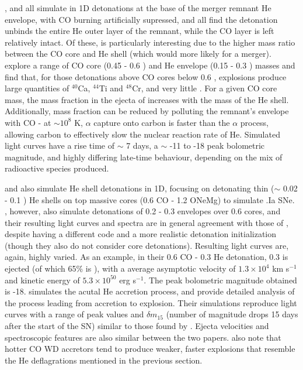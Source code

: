 \cite{woosk10}, \cite{shen+10} and \cite{wald+10} all simulate in 1D detonations at the base of the merger remnant He envelope, with CO burning artificially supressed, and all find the detonation unbinds the entire He outer layer of the remnant, while the CO layer is left relatively intact.  Of these, \citeauthor{wald+10} is particularly interesting due to the higher mass ratio between the CO core and He shell (which would more likely for a merger).  \citeauthor{wald+10} explore a range of CO core (0.45 - 0.6 {\Msun}) and He envelope (0.15 - 0.3 {\Msun}) masses and find that, for those detonations above CO cores below 0.6 {\Msun}, explosions produce large quantities of $^{40}$Ca, $^{44}$Ti and $^{48}$Cr, and very little {\Ni}.  For a given CO core mass, the mass fraction in the ejecta of {\Ni} increases with the mass of the He shell.  Additionally, {\Ni} mass fraction can be reduced by polluting the remnant's envelope with CO - at $\sim 10^8$ K, $\alpha$ capture onto carbon is faster than the $\alpha$ process, allowing carbon to effectively slow the nuclear reaction rate of He.  Simulated light curves have a rise time of $\sim$ 7 days, a $\sim$ -11 to -18 peak bolometric magnitude, and highly differing late-time behaviour, depending on the mix of radioactive species produced.

\cite{shen+10} and \cite{woosk10} also simulate He shell detonations in 1D, focusing on detonating thin ($\sim$ 0.02 - 0.1 {\Msun}) He shells on top massive cores (0.6 {\Msun} CO - 1.2 {\Msun} ONeMg) to simulate .Ia SNe.  \citeauthor{shen+10}, however, also simulate detonations of 0.2 - 0.3 {\Msun} envelopes over 0.6 {\Msun} cores, and their resulting light curves and spectra are in general agreement with those of \citeauthor{wald+10}, despite having a different code and a more realistic detonation initialization (though they also do not consider core detonations).  Resulting light curves are, again, highly varied.  As an example, in their 0.6 {\Msun} CO - 0.3 {\Msun} He detonation, 0.3 {\Msun} is ejected (of which 65\% is {\Ni}), with a average asymptotic velocity of $1.3 \times 10^{4}$ km s$^{-1}$ and kinetic energy of $5.3 \times 10^{50}$ erg s$^{-1}$.  The peak bolometric magnitude obtained is -18.  \citeauthor{woosk10} simulates the acutal He accretion process, and provide detailed analysis of the process leading from accretion to explosion.  Their simulations reproduce light curves with a range of peak values and ${\delta}m_{15}$ (number of magnitude drops 15 days after the start of the SN) similar to those found by \citeauthor{shen+10}.  Ejecta velocities and spectroscopic features are also similar between the two papers.  \cite{woosk10} also note that hotter CO WD accretors tend to produce weaker, faster explosions that resemble the He deflagrations mentioned in the previous section.

